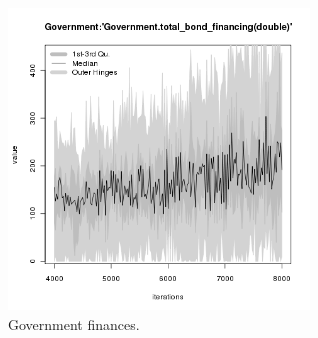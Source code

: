 \begin{figure}[H!]
\begin{minipage}{17cm}
\includegraphics[width=8cm]{./png/tax_0.05/Government-total_bond_financing.png}
\end{minipage}
\caption{Government finances.}
\label{Figure: Government}
\end{figure}
\clearpage

